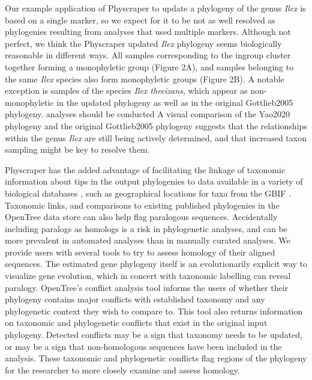 \documentclass{bmcart}
\begin{document}
Our example application of Physcraper to update a phylogeny of the genus \textit{Ilex} is based on a
single marker, so we expect for it to be not as well resolved as phylogenies resulting from analyses
that used multiple markers. Although not perfect,
we think the Physcraper updated \textit{Ilex} phylogeny seems biologically reasonable
in different ways. All samples
corresponding to the ingroup cluster together forming a monophyletic group (Figure 2A), and
samples belonging to the same \textit{Ilex} species also form
monophyletic groups (Figure 2B). A notable exception is samples of the species \textit{Ilex theeizans}, which appear as
non-monophyletic in the updated phylogeny as well as in the original Gottlieb2005 phylogeny.
analyses should be conducted
A visual comparison of the Yao2020 phylogeny and the original Gottlieb2005 phylogeny suggests
that the relationships within the genus \textit{Ilex} are still being actively
determined, and that increased taxon sampling might be key to resolve them.

Physcraper has the added advantage of facilitating the linkage of taxonomic information about tips
in the output phylogenies to data available in a variety of biological databases
\cite{rees2017automated}, such as
geographical locations for taxa from the GBIF \cite{gbif_secretariat_gbif_2019}.
Taxonomic links, and comparisons to existing published phylogenies in the OpenTree
data store can also help flag paralogous sequences.
Accidentally including paralogs as homologs is a risk in phylogenetic analyses,
and can be more prevalent in automated analyses than in manually curated analyses.
We provide users with several tools to try to assess homology of their aligned sequences.
The estimated gene phylogeny itself is an evolutionarily explicit way to visualize gene
evolution, which in concert with taxonomic labelling can reveal paralogy.
OpenTree's conflict analysis tool informs the users of whether their phylogeny contains major
conflicts with established taxonomy and any phylogenetic context they wish to compare to.
This tool also returns information on taxonomic and phylogenetic conflicts that exist
in the original input phylogeny.
Detected conflicts may be a sign that taxonomy needs to be updated, or may be a sign
that non-homologous sequences have been included in the analysis.
These taxonomic and phylogenetic conflicts flag regions of the phylogeny for the researcher
to more closely examine and assess homology.
\end{document}
